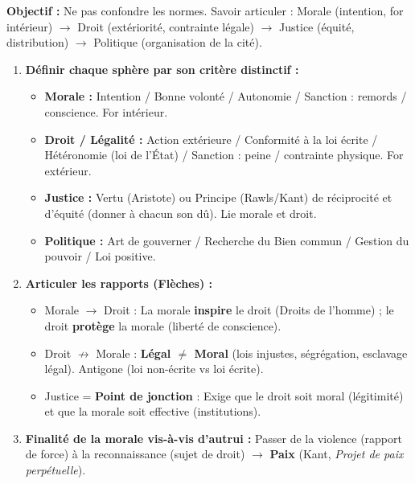 \documentclass[11pt]{article}
\newcommand{\cle}[1]{{\popxbold\color{popdark}#1}}
\begin{document}
\begin{methode}
\textbf{Objectif :} Ne pas confondre les normes. Savoir articuler : Morale (intention, for intérieur) $\rightarrow$ Droit (extériorité, contrainte légale) $\rightarrow$ Justice (équité, distribution) $\rightarrow$ Politique (organisation de la cité).
\begin{enumerate}
    \item \textbf{Définir chaque sphère par son critère distinctif :}
    \begin{itemize}
        \item \textbf{Morale :} Intention / Bonne volonté / Autonomie / Sanction : remords / conscience. \cle{For intérieur}.
        \item \textbf{Droit / Légalité :} Action extérieure / Conformité à la loi écrite / Hétéronomie (loi de l'État) / Sanction : peine / contrainte physique. \cle{For extérieur}.
        \item \textbf{Justice :} Vertu (Aristote) ou Principe (Rawls/Kant) de \cle{réciprocité} et d'\cle{équité} (donner à chacun son dû). Lie morale et droit.
        \item \textbf{Politique :} Art de gouverner / Recherche du \cle{Bien commun} / Gestion du pouvoir / Loi positive.
    \end{itemize}
    \item \textbf{Articuler les rapports (Flèches) :}
    \begin{itemize}
        \item Morale $\rightarrow$ Droit : La morale \textbf{inspire} le droit (Droits de l'homme) ; le droit \textbf{protège} la morale (liberté de conscience).
        \item Droit $\nrightarrow$ Morale : \textbf{Légal $\neq$ Moral} (lois injustes, ségrégation, esclavage légal). Antigone (loi non-écrite vs loi écrite).
        \item Justice = \textbf{Point de jonction} : Exige que le droit soit moral (légitimité) et que la morale soit effective (institutions).
    \end{itemize}
    \item \textbf{Finalité de la morale vis-à-vis d'autrui :} Passer de la \cle{violence} (rapport de force) à la \cle{reconnaissance} (sujet de droit) $\rightarrow$ \textbf{Paix} (Kant, \emph{Projet de paix perpétuelle}).
\end{enumerate}
\end{methode}
\end{document}
